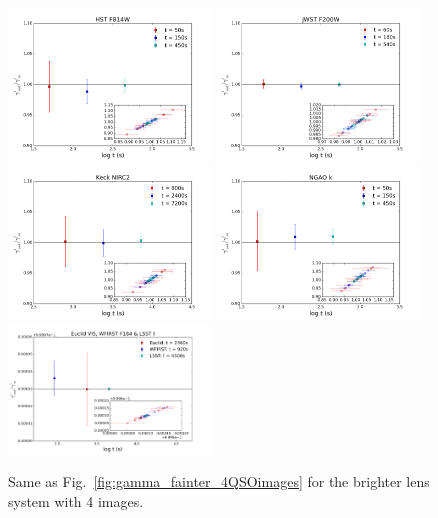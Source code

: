 \documentclass[a4paper,11pt]{article}
\begin{document}
\begin{figure}
\begin{center}
\includegraphics[width=0.48\textwidth]{figures/gamma_0330_anti_4QSOimages_HST.png}
\includegraphics[width=0.48\textwidth]{figures/gamma_0330_anti_4QSOimages_JWST.png} \\
\includegraphics[width=0.48\textwidth]{figures/gamma_0330_anti_4QSOimages_Keck.png}
\includegraphics[width=0.48\textwidth]{figures/gamma_0330_anti_4QSOimages_NGAO.png} \\
\includegraphics[width=0.48\textwidth]{figures/gamma_0330_anti_4QSOimages_EWL.png}
\end{center}
\caption{Same as Fig.~\ref{fig:gamma_fainter_4QSOimages} for the brighter lens system with 4 images.
\label{fig:gamma_brighter_4QSOimages}}
\end{figure}
\end{document}
